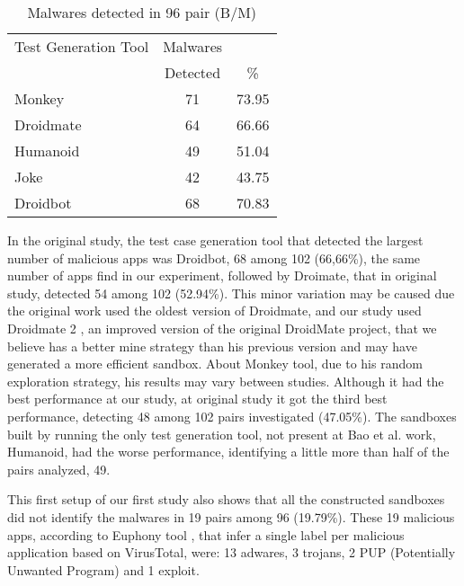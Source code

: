 \begin{table}[ht]
\centering
\begin{tabular}{lcc}\toprule
 Test Generation Tool & Malwares & \\
 & Detected & \% \\ \midrule
 Monkey & 71 & 73.95 \\
 Droidmate & 64 &  66.66  \\
 Humanoid & 49 & 51.04  \\
 Joke & 42 & 43.75  \\
 Droidbot & 68 & 70.83  \\\midrule
 
\end{tabular} 
\caption{Malwares detected in 96 pair (B/M)}
\label{tab:malware}
\end{table}

In the original study, the test case generation tool that detected the largest number of malicious apps was Droidbot, 68 among 102 (66,66\%), the same number of apps find in our experiment, followed by Droimate, that in original study, detected 54 among 102 (52.94\%). This minor variation may be caused due the original work used the oldest version of Droidmate, and our study used Droidmate 2 \cite{DBLP:conf/kbse/BorgesHZ18}, an improved version of the original DroidMate project, that we believe has a better mine strategy than his previous version and may have generated a more efficient sandbox. About Monkey tool, due to his random exploration strategy, his results may vary between studies. Although it had the best performance at our study, at original study it got the third best performance, detecting 48 among 102 pairs investigated (47.05\%). The sandboxes built by running the only test generation tool, not present at Bao et al. work, Humanoid, had the worse performance, identifying a little more than half of the pairs analyzed, 49.

This first setup of our first study also shows that all the constructed sandboxes did not identify the malwares in 19 pairs among 96 (19.79\%). These 19 malicious apps, according to Euphony tool \cite{hurier2017euphony}, that infer a single label per malicious application based on VirusTotal, were: 13 adwares, 3 trojans, 2 PUP (Potentially Unwanted Program) and 1 exploit.

